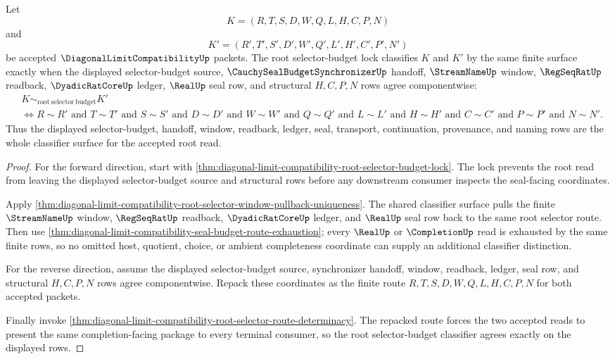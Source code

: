 \begin{theorem}
\label{thm:diagonal-limit-compatibility-selector-budget-lock-exactness}
Let
$$
K=(R,T,S,D,W,Q,L,H,C,P,N)
$$
and
$$
K'=(R',T',S',D',W',Q',L',H',C',P',N')
$$
be accepted $\DiagonalLimitCompatibilityUp$ packets. The root selector-budget lock classifies $K$ and $K'$ by the same finite surface exactly when the displayed selector-budget source, $\CauchySealBudgetSynchronizerUp$ handoff, $\StreamNameUp$ window, $\RegSeqRatUp$ readback, $\DyadicRatCoreUp$ ledger, $\RealUp$ seal row, and structural $H,C,P,N$ rows agree componentwise:
$$
\begin{aligned}
&K \sim_{\mathrm{root\ selector\ budget}} K'\\
&\Longleftrightarrow
R \sim R'
\text{ and } T \sim T'
\text{ and } S \sim S'
\text{ and } D \sim D'
\text{ and } W \sim W'
\text{ and } Q \sim Q'
\text{ and } L \sim L'
\text{ and } H \sim H'
\text{ and } C \sim C'
\text{ and } P \sim P'
\text{ and } N \sim N' .
\end{aligned}
$$
Thus the displayed selector-budget, handoff, window, readback, ledger, seal, transport, continuation, provenance, and naming rows are the whole classifier surface for the accepted root read.
\end{theorem}
\begin{proof}
For the forward direction, start with \autoref{thm:diagonal-limit-compatibility-root-selector-budget-lock}. The lock prevents the root read from leaving the displayed selector-budget source and structural rows before any downstream consumer inspects the seal-facing coordinates.

Apply \autoref{thm:diagonal-limit-compatibility-root-selector-window-pullback-uniqueness}. The shared classifier surface pulls the finite $\StreamNameUp$ window, $\RegSeqRatUp$ readback, $\DyadicRatCoreUp$ ledger, and $\RealUp$ seal row back to the same root selector route. Then use \autoref{thm:diagonal-limit-compatibility-seal-budget-route-exhaustion}; every $\RealUp$ or $\CompletionUp$ read is exhausted by the same finite rows, so no omitted host, quotient, choice, or ambient completeness coordinate can supply an additional classifier distinction.

For the reverse direction, assume the displayed selector-budget source, synchronizer handoff, window, readback, ledger, seal row, and structural $H,C,P,N$ rows agree componentwise. Repack these coordinates as the finite route $R,T,S,D,W,Q,L,H,C,P,N$ for both accepted packets.

Finally invoke \autoref{thm:diagonal-limit-compatibility-root-selector-route-determinacy}. The repacked route forces the two accepted reads to present the same completion-facing package to every terminal consumer, so the root selector-budget classifier agrees exactly on the displayed rows.
\end{proof}


